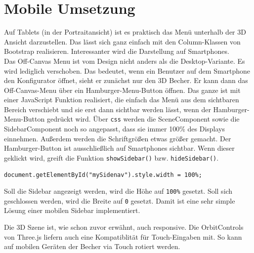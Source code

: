 \section{Mobile Umsetzung}
\label{sec:umsetzung}
%
Auf Tablets (in der Portraitansicht) ist es praktisch das Menü unterhalb der 3D Ansicht darzustellen. Das lässt sich ganz einfach mit den Column-Klassen von Bootstrap realisieren. Interessanter wird die Darstellung auf Smartphones.\\
Das Off-Canvas Menu ist vom Design nicht anders als die Desktop-Variante. Es wird lediglich verschoben. Das bedeutet, wenn ein Benutzer auf dem Smartphone den Konfigurator öffnet, sieht er zunächst nur den 3D Becher. Er kann dann das Off-Canvas-Menu über ein Hamburger-Menu-Button öffnen. Das ganze ist mit einer JavaScript Funktion realisiert, die einfach das Menü aus dem sichtbaren Bereich verschiebt und sie erst dann sichtbar werden lässt, wenn der Hamburger-Menu-Button gedrückt wird. Über \texttt{css} werden die SceneComponent sowie die SidebarComponent noch so angepasst, dass sie immer 100\% des Displays einnehmen. Außerdem werden die Schriftgrößen etwas größer gemacht.
Der Hamburger-Button ist ausschließlich auf Smartphones sichtbar. Wenn dieser geklickt wird, greift die Funktion \texttt{showSidebar()} bzw. \texttt{hideSidebar()}.
%
\begin{lstlisting}[caption={Ausschnitt der ShowSidebar()-Funktion},label=lst:showsidebar]
document.getElementById("mySidenav").style.width = 100%;
\end{lstlisting}
%
Soll die Sidebar angezeigt werden, wird die Höhe auf \texttt{100\%} gesetzt. Soll sich geschlossen werden, wird die Breite auf \texttt{0} gesetzt. Damit ist eine sehr simple Lösung einer mobilen Sidebar implementiert.

Die 3D Szene ist, wie schon zuvor erwähnt, auch responsive. Die OrbitControls von Three.js liefern auch eine Kompatiblität für Touch-Eingaben mit. So kann auf mobilen Geräten der Becher via Touch rotiert werden.
%
